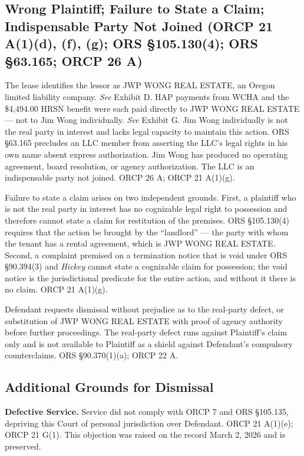\documentclass[12pt,letterpaper]{article}
\begin{document}
\subsection{Wrong Plaintiff; Failure to State a Claim; Indispensable Party Not Joined (ORCP 21 A(1)(d), (f), (g); ORS \S105.130(4); ORS \S63.165; ORCP 26 A)}

The lease identifies the lessor as JWP WONG REAL ESTATE, an Oregon limited liability company. \textit{See} Exhibit D. HAP payments from WCHA and the \$4,494.00 HRSN benefit were each paid directly to JWP WONG REAL ESTATE --- not to Jim Wong individually. \textit{See} Exhibit G. Jim Wong individually is not the real party in interest and lacks legal capacity to maintain this action. ORS \S63.165 precludes an LLC member from asserting the LLC's legal rights in his own name absent express authorization. Jim Wong has produced no operating agreement, board resolution, or agency authorization. The LLC is an indispensable party not joined. ORCP 26 A; ORCP 21 A(1)(g).

Failure to state a claim arises on two independent grounds. First, a plaintiff who is not the real party in interest has no cognizable legal right to possession and therefore cannot state a claim for restitution of the premises. ORS \S105.130(4) requires that the action be brought by the ``landlord'' --- the party with whom the tenant has a rental agreement, which is JWP WONG REAL ESTATE. Second, a complaint premised on a termination notice that is void under ORS \S90.394(3) and \textit{Hickey} cannot state a cognizable claim for possession; the void notice is the jurisdictional predicate for the entire action, and without it there is no claim. ORCP 21 A(1)(g).

Defendant requests dismissal without prejudice as to the real-party defect, or substitution of JWP WONG REAL ESTATE with proof of agency authority before further proceedings. The real-party defect runs against Plaintiff's claim only and is not available to Plaintiff as a shield against Defendant's compulsory counterclaims. ORS \S90.370(1)(a); ORCP 22 A.

\subsection{Additional Grounds for Dismissal}

\textbf{Defective Service.} Service did not comply with ORCP 7 and ORS \S105.135, depriving this Court of personal jurisdiction over Defendant. ORCP 21 A(1)(e); ORCP 21 G(1). This objection was raised on the record March 2, 2026 and is preserved.
\end{document}
